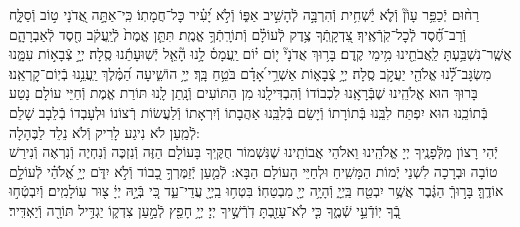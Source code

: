 \documentclass[twoside, openany, parskip=half, 11pt]{book}
\begin{document}
%
רַח֨וּם יְֿכַפֵּ֥ר עָוֹן֘ וְֿלֹ֢א יַ֫שְׁחִ֥ית וְֿהִרְבָּ֣ה לְֿהָשִׁ֣יב אַפּ֑וֹ וְֿלֹ֣א יָ֝עִ֗יר כׇּל־חֲמָתֽוֹ׃ כִּֽי־אַתָּ֣ה
%
אֲ֭דֹנָי ט֣וֹב וְֿסַלָּ֑ח וְֿרַב־חֶ֝֗סֶד לְֿכׇל־קֹֽרְֿאֶֽיךָ׃ צִ֭דְקָֽתְֿךָ
%
צֶ֥דֶק לְֿעוֹלָ֗ם וְֿתוֹרָֽתְֿךָ֥ אֱמֶֽת׃ תִּתֵּ֤ן
%
אֱמֶת֙ לְֿיַֽעֲקֹ֔ב חֶ֖סֶד לְֿאַבְרָהָ֑ם אֲשֶֽׁר־נִשְׁבַּ֥עְתָּ לַֽאֲבֹתֵ֖ינוּ מִ֥ימֵי קֶֽדֶם׃ בָּר֥וּךְ
%
אֲדֹנָי֘ י֤וֹם י֗וֹם יַֽעֲמָס֫ לָ֥נוּ הָ֘אֵ֤ל יְֿשֽׁוּעָתֵ֬נוּ סֶֽלָה׃ יְיָ֣
%
צְֿבָא֣וֹת עִמָּ֑נוּ מִשְׂגָּב־לָ֝֗נוּ אֱלֹהֵ֖י יַעֲקֹ֣ב סֶֽלָה׃ יְיָ֥
%
צְֿבָא֑וֹת אַשְׁרֵ֥י ֝אָדָ֗ם בֹּטֵ֥חַ בָּֽךְ׃ יְיָ֥
%
הוֹשִׁ֑יעָה הַ֝מֶּ֗לֶךְ יַֽעֲנֵ֥נוּ בְֿיֽוֹם־קׇרְאֵֽנוּ׃ \\
בָּרוּךְ הוּא אֱלֹהֵֽינוּ שֶׁבְּֿרָאָֽנוּ לִכְבוֹדוֹ וְֿהִבְדִּילָֽנוּ מִן הַתּוֹעִים וְֿנָֽתַן לָֽנוּ תּוֹרַת אֱמֶת וְֿחַיֵּי עוֹלָם נָטַע בְּֿתוֹכֵֽנוּ הוּא יִפְתַּח לִבֵּֽנוּ בְּֿתוֹרָתוֹ וְֿיָשֵׂם בְּֿלִבֵּֽנוּ אַהֲבָתוֹ וְֿיִרְאָתוֹ וְֿלַעֲשׂוֹת רְֿצוֹנוֹ וּלְעָבְדוֹ בְֿלֵבָב שָׁלֵם לְֿמַֽעַן לֹא נִיגַע לָרִיק וְֿלֹא נֵלֵד לַבֶּהָלָה:\\
יְֿהִי רָצוֹן מִלְּֿפָנֶֽיךָ יְיָ אֱלֹהֵֽינוּ וֵאלֹהֵי אֲבוֹתֵֽינוּ שֶׁנִּשְׁמוֹר חֻקֶּֽיךָ בָּעוֹלָם הַזֶּה וְֿנִזְכֶּה וְֿנִחְיֶה וְֿנִרְאֶה וְֿנִירַשׁ טוֹבָה וּבְרָכָה לִשְׁנֵי יְֿמוֹת הַמָּשִֽׁיחַ וּלְחַיֵּי הָעוֹלָם הַבָּא: לְֿמַ֤עַן יְֿזַמֶּרְךָ֣ כָ֭בוֹד וְֿלֹ֣א יִדֹּ֑ם יְיָ֥ אֱ֝לֹהַ֗י לְֿעוֹלָ֣ם אוֹדֶֽךָּ׃ בָּר֣וּךְֿ הַגֶּ֔בֶר אֲשֶׁ֥ר יִבְטַ֖ח בַּֽיְיָ֑ וְֿהָיָ֥ה יְיָ֖ מִבְטַחֽוֹ׃ בִּטְח֥וּ
%
בַֽיְיָ֖ עֲדֵי־עַ֑ד כִּ֚י בְּֿיָ֣הּ יְיָ֔ צ֖וּר עֽוֹלָמִֽים׃  וְֿיִבְטְֿח֣וּ
%
בְֿ֭ךָ יֽוֹדְֿעֵ֣י שְֿׁמֶ֑ךָ כִּ֤י לֹֽא־עָזַ֖בְתָּ דֹֽרְֿשֶׁ֣יךָ יְיָ׃ יְיָ֥
%
חָפֵ֖ץ לְֿמַ֣עַן צִדְק֑וֹ יַגְדִּ֥יל תּוֹרָ֖ה וְֿיַאְדִּֽיר׃


 \\

\label{veyiten lecha}
\end{document}
